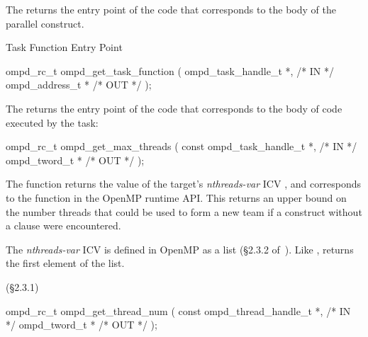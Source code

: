 \descr
The  returns the
entry point of the code that corresponds to the body of
the parallel construct.
\argdesc

\crossreferences


\summary
Task Function Entry Point
\format
\ccppspecificstart
\begin{boxedcode}
ompd\_rc\_t ompd\_get\_task\_function (
  ompd\_task\_handle\_t *,                                 /* IN */
  ompd\_address\_t *                                 /* OUT */
);
\end{boxedcode}
\ccppspecificend

\descr
The  returns the entry point of the code
that corresponds to the body of code executed by the task:

\argdesc

\crossreferences


\summary

\format
\ccppspecificstart
\begin{boxedcode}
ompd\_rc\_t ompd\_get\_max\_threads (
  const ompd\_task\_handle\_t  *,                           /* IN */
  ompd\_tword\_t              *                                   /* OUT */
); 
\end{boxedcode}
\ccppspecificend

\descr
The  function returns the value of the
target's \emph{nthreads-var} ICV ,
and corresponds to the  function
in the OpenMP runtime API.
This returns an upper bound on the number threads that could be used
to form a new team if a  construct without a
 clause were encountered.

The \emph{nthreads-var} ICV is defined in OpenMP as a list
(\S2.3.2 of~\cite{OpenMP}).
Like , 
returns the first element of the list.

\argdesc

\crossreferences
(\S2.3.1)

\summary

\format
\ccppspecificstart
\begin{boxedcode}
ompd\_rc\_t ompd\_get\_thread\_num (
  const ompd\_thread\_handle\_t *,                       /* IN */
  ompd\_tword\_t *                                 /* OUT */
);
\end{boxedcode}
\ccppspecificend

